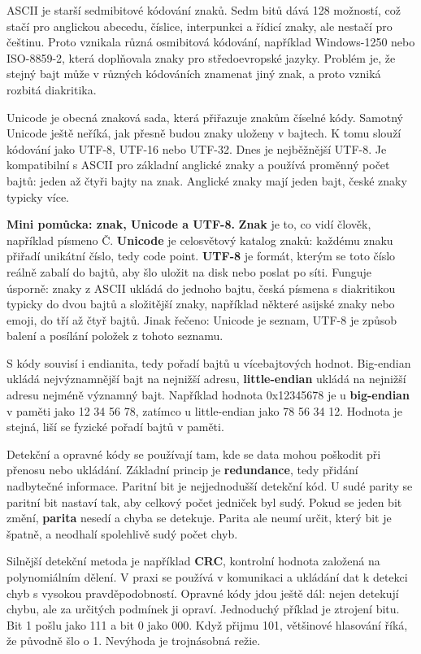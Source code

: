 \documentclass[11pt,a4paper]{article}
\newcommand{\itpr}[1]{\medskip\noindent\colorbox{green!8}{\parbox{\dimexpr\linewidth-2\fboxsep}{#1}}\medskip}
\begin{document}
ASCII je starší sedmibitové kódování znaků. Sedm bitů dává 128 možností, což stačí pro anglickou abecedu, číslice, interpunkci a řídicí znaky, ale nestačí pro češtinu. Proto vznikala různá osmibitová kódování, například Windows-1250 nebo ISO-8859-2, která doplňovala znaky pro středoevropské jazyky. Problém je, že stejný bajt může v různých kódováních znamenat jiný znak, a proto vzniká rozbitá diakritika.

Unicode je obecná znaková sada, která přiřazuje znakům číselné kódy. Samotný Unicode ještě neříká, jak přesně budou znaky uloženy v bajtech. K tomu slouží kódování jako UTF-8, UTF-16 nebo UTF-32. Dnes je nejběžnější UTF-8. Je kompatibilní s ASCII pro základní anglické znaky a používá proměnný počet bajtů: jeden až čtyři bajty na znak. Anglické znaky mají jeden bajt, české znaky typicky více.

\itpr{\textbf{Mini pomůcka: znak, Unicode a UTF-8.} \textbf{Znak} je to, co vidí člověk, například písmeno Č. \textbf{Unicode} je celosvětový katalog znaků: každému znaku přiřadí unikátní číslo, tedy code point. \textbf{UTF-8} je formát, kterým se toto číslo reálně zabalí do bajtů, aby šlo uložit na disk nebo poslat po síti. Funguje úsporně: znaky z ASCII ukládá do jednoho bajtu, česká písmena s diakritikou typicky do dvou bajtů a složitější znaky, například některé asijské znaky nebo emoji, do tří až čtyř bajtů. Jinak řečeno: Unicode je seznam, UTF-8 je způsob balení a posílání položek z tohoto seznamu.}

S kódy souvisí i endianita, tedy pořadí bajtů u vícebajtových hodnot. Big-endian ukládá nejvýznamnější bajt na nejnižší adresu, \textbf{little-endian} ukládá na nejnižší adresu nejméně významný bajt. Například hodnota 0x12345678 je u \textbf{big-endian} v paměti jako 12 34 56 78, zatímco u little-endian jako 78 56 34 12. Hodnota je stejná, liší se fyzické pořadí bajtů v paměti.

Detekční a opravné kódy se používají tam, kde se data mohou poškodit při přenosu nebo ukládání. Základní princip je \textbf{redundance}, tedy přidání nadbytečné informace. Paritní bit je nejjednodušší detekční kód. U sudé parity se paritní bit nastaví tak, aby celkový počet jedniček byl sudý. Pokud se jeden bit změní, \textbf{parita} nesedí a chyba se detekuje. Parita ale neumí určit, který bit je špatně, a neodhalí spolehlivě sudý počet chyb.

Silnější detekční metoda je například \textbf{CRC}, kontrolní hodnota založená na polynomiálním dělení. V praxi se používá v komunikaci a ukládání dat k detekci chyb s vysokou pravděpodobností. Opravné kódy jdou ještě dál: nejen detekují chybu, ale za určitých podmínek ji opraví. Jednoduchý příklad je ztrojení bitu. Bit 1 pošlu jako 111 a bit 0 jako 000. Když přijmu 101, většinové hlasování říká, že původně šlo o 1. Nevýhoda je trojnásobná režie.
\end{document}
